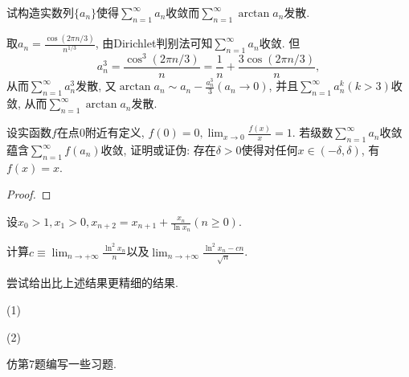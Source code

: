 \begin{quizb}
\begin{solution}
\end{solution}
\woe 试构造实数列\(\{a_n\}\)使得\(\sum_{n=1}^{\infty}a_n\)收敛而\(\sum_{n=1}^{\infty}\arctan a_n\)发散.
\begin{solution}
	取\(a_n=\frac{\cos(2\pi n/3)}{n^{1/3}}\), 由Dirichlet判别法可知$\sum_{n=1}^{\infty}a_n$收敛. 但\[a_n^3=\frac{\cos^3(2\pi n/3)}{n}=\frac{1}{n}+\frac{3\cos(2\pi n/3)}{n},\]从而\(\sum_{n=1}^{\infty}a_n^3\)发散, 又\(\arctan a_n\sim a_n-\frac{a_n^3}{3}(a_n\rightarrow 0)\), 并且\(\sum_{n=1}^{\infty}a_n^k(k>3)\)收敛, 从而\(\sum_{n=1}^{\infty}\arctan a_n\)发散.
\end{solution}
\woe 设实函数\(f\)在点\(0\)附近有定义, \(f(0)=0,\lim_{x\rightarrow 0}\frac{f(x)}{x}=1\). 若级数\(\sum_{n=1}^{\infty}a_n\)收敛蕴含\(\sum_{n=1}^{\infty}f(a_n)\)收敛, 证明或证伪: 存在\(\delta>0\)使得对任何\(x\in\left(-\delta,\delta\right)\), 有\(f(x)=x\).
\begin{proof}
	
\end{proof}
\woe 设\(x_0>1,x_1>0,x_{n+2}=x_{n+1}+\frac{x_n}{\ln x_n}(n\geqslant 0)\).
\begin{quizs}
\item 计算\(c\equiv\lim_{n\rightarrow+\infty}\frac{\ln^2x_n}{n}\)以及\(\lim_{n\rightarrow+\infty}\frac{\ln^2x_n-cn}{\sqrt{n}}\).
\item 尝试给出比上述结果更精细的结果.
\end{quizs}
\begin{solution}
(1)

(2)
\end{solution}
\woe 仿第7题编写一些习题.
\end{quizb}